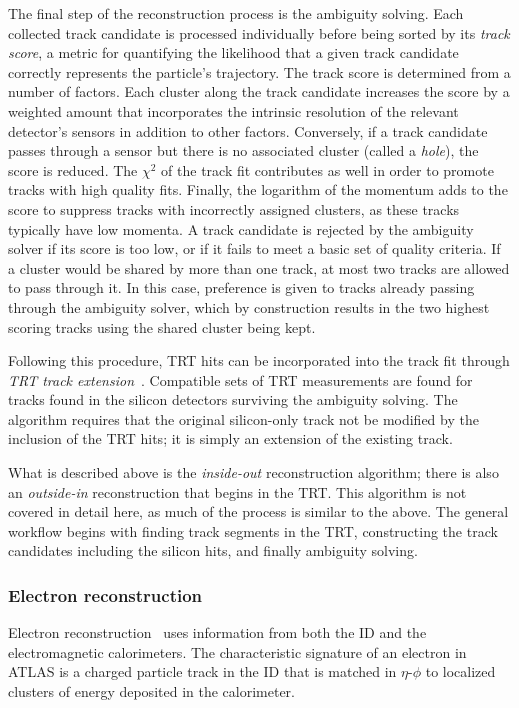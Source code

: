 The final step of the reconstruction process is the ambiguity solving.
Each collected track candidate is processed individually before being sorted by its \emph{track score}, a metric for quantifying the likelihood that a given track candidate correctly represents the particle's trajectory.
The track score is determined from a number of factors.
Each cluster along the track candidate increases the score by a weighted amount that incorporates the intrinsic resolution of the relevant detector's sensors in addition to other factors.
Conversely, if a track candidate passes through a sensor but there is no associated cluster (called a \emph{hole}), the score is reduced.
The $\chi^2$ of the track fit contributes as well in order to promote tracks with high quality fits.
Finally, the logarithm of the momentum adds to the score to suppress tracks with incorrectly assigned clusters, as these tracks typically have low momenta.
A track candidate is rejected by the ambiguity solver if its score is too low, or if it fails to meet a basic set of quality criteria.
If a cluster would be shared by more than one track, at most two tracks are allowed to pass through it.
In this case, preference is given to tracks already passing through the ambiguity solver, which by construction results in the two highest scoring tracks using the shared cluster being kept.

Following this procedure, TRT hits can be incorporated into the track fit through \emph{TRT track extension}~\cite{2008.newt}.
Compatible sets of TRT measurements are found for tracks found in the silicon detectors surviving the ambiguity solving.
The algorithm requires that the original silicon-only track not be modified by the inclusion of the TRT hits; it is simply an extension of the existing track.

What is described above is the \emph{inside-out} reconstruction algorithm; there is also an \emph{outside-in} reconstruction that begins in the TRT.
This algorithm is not covered in detail here, as much of the process is similar to the above.
The general workflow begins with finding track segments in the TRT, constructing the track candidates including the silicon hits, and finally ambiguity solving.

\subsubsection{Electron reconstruction}\label{detector:electron_reconstruction}
Electron reconstruction~\cite{2019.electron-reco-id} uses information from both the ID and the electromagnetic calorimeters.
The characteristic signature of an electron in ATLAS is a charged particle track in the ID that is matched in $\eta$-$\phi$ to localized clusters of energy deposited in the calorimeter.

